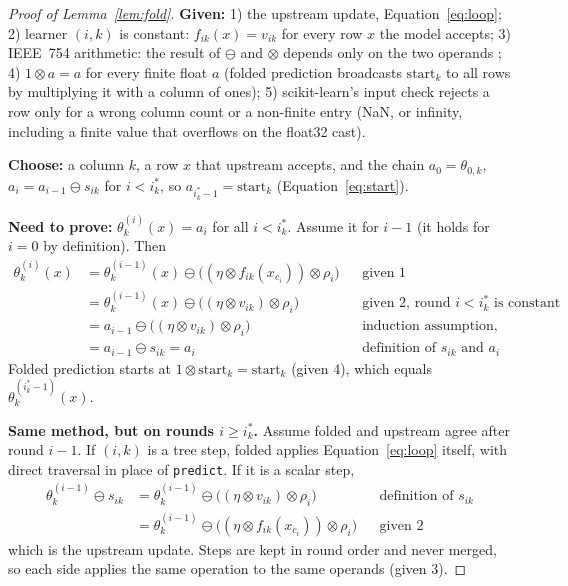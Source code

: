 \documentclass{article}
\newcommand{\fsub}{\ominus}
\newcommand{\fmul}{\otimes}
\begin{document}
\begin{proof}[Proof of Lemma~\ref{lem:fold}]
\textbf{Given:}
1) the upstream update, Equation~\eqref{eq:loop};
2) learner $(i,k)$ is constant: $f_{ik}(x) = v_{ik}$ for every row $x$ the model accepts;
3) IEEE~754 arithmetic: the result of $\fsub$ and $\fmul$ depends only on the two operands \citep{goldberg1991floating};
4) $1 \fmul a = a$ for every finite float $a$ (folded prediction broadcasts $\text{start}_k$ to all rows by multiplying it with a column of ones);
5) scikit-learn's input check rejects a row only for a wrong column count or a non-finite entry (NaN, or infinity, including a finite value that overflows on the float32 cast).

\textbf{Choose:} a column $k$, a row $x$ that upstream accepts, and the chain $a_0 = \theta_{0,k}$, $a_i = a_{i-1} \fsub s_{ik}$ for $i < i^*_k$, so $a_{i^*_k - 1} = \text{start}_k$ (Equation~\eqref{eq:start}).

\textbf{Need to prove:} $\theta_k^{(i)}(x) = a_i$ for all $i < i^*_k$. Assume it for $i-1$ (it holds for $i = 0$ by definition). Then
\begin{align*}
\theta_k^{(i)}(x) &= \theta_k^{(i-1)}(x) \fsub \big((\eta \fmul f_{ik}(x_{c_i})) \fmul \rho_i\big) && \text{given 1}\\
&= \theta_k^{(i-1)}(x) \fsub \big((\eta \fmul v_{ik}) \fmul \rho_i\big) && \text{given 2, round } i < i^*_k \text{ is constant}\\
&= a_{i-1} \fsub \big((\eta \fmul v_{ik}) \fmul \rho_i\big) && \text{induction assumption, given 3}\\
&= a_{i-1} \fsub s_{ik} = a_i && \text{definition of } s_{ik} \text{ and } a_i
\end{align*}
Folded prediction starts at $1 \fmul \text{start}_k = \text{start}_k$ (given 4), which equals $\theta_k^{(i^*_k - 1)}(x)$.

\textbf{Same method, but on rounds $i \ge i^*_k$.} Assume folded and upstream agree after round $i-1$. If $(i,k)$ is a tree step, folded applies Equation~\eqref{eq:loop} itself, with direct traversal in place of \texttt{predict}. If it is a scalar step,
\begin{align*}
\theta_k^{(i-1)} \fsub s_{ik} &= \theta_k^{(i-1)} \fsub \big((\eta \fmul v_{ik}) \fmul \rho_i\big) && \text{definition of } s_{ik}\\
&= \theta_k^{(i-1)} \fsub \big((\eta \fmul f_{ik}(x_{c_i})) \fmul \rho_i\big) && \text{given 2}
\end{align*}
which is the upstream update. Steps are kept in round order and never merged, so each side applies the same operation to the same operands (given 3).


\end{proof}
\end{document}
